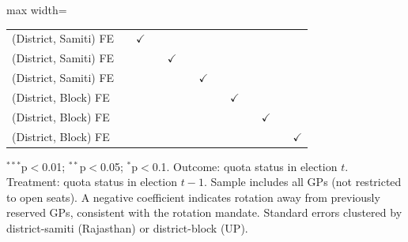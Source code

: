 \begin{adjustbox}{max width=\linewidth}
\begin{threeparttable}[b]
\begin{tabular}{lcccccccccccc}
          \\
         (District, Samiti) FE &              & $\checkmark$  &               &               &               &               &               &               &               &               &               & \\  
         (District, Samiti) FE &              &               &               & $\checkmark$  &               &               &               &               &               &               &               & \\  
         (District, Samiti) FE &              &               &               &               &               & $\checkmark$  &               &               &               &               &               & \\  
         (District, Block) FE  &              &               &               &               &               &               &               & $\checkmark$  &               &               &               & \\  
         (District, Block) FE  &              &               &               &               &               &               &               &               &               & $\checkmark$  &               & \\  
         (District, Block) FE  &              &               &               &               &               &               &               &               &               &               &               & $\checkmark$\\   
         \bottomrule
      \end{tabular}
      
      \begin{tablenotes}
         \item $^{***}$p$<$0.01; $^{**}$p$<$0.05; $^{*}$p$<$0.1. Outcome: quota status in election $t$. Treatment: quota status in election $t-1$. Sample includes all GPs (not restricted to open seats). A negative coefficient indicates rotation away from previously reserved GPs, consistent with the rotation mandate. Standard errors clustered by district-samiti (Rajasthan) or district-block (UP).
      \end{tablenotes}
   \end{threeparttable}
\end{adjustbox}
\par\endgroup


